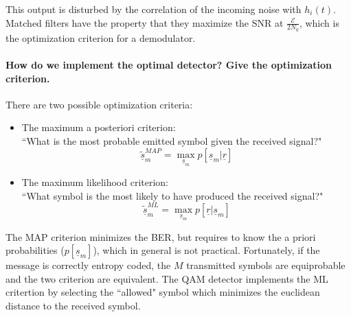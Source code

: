 This output is disturbed by the correlation of the incoming noise with $h_i(t)$. Matched filters have the property that they maximize the SNR at $\frac{\mathcal{E}}{2N_0}$, which is the optimization criterion for a demodulator.

\paragraph{How do we implement the optimal detector? Give the optimization criterion.}
There are two possible optimization criteria:
\begin{itemize}
  \item The maximum a posteriori criterion:\\
  ``What is the most probable emitted symbol given the received signal?"
  \[
  \underline{\tilde{s}}_m^{MAP} = \max_{\underline{s}_m} p[\underline{s}_m|\underline{r}]
  \]
  \item The maximum likelihood criterion:\\
  ``What symbol is the most likely to have produced the received signal?"
  \[
  \underline{\tilde{s}}_m^{ML} = \max_{\underline{s}_m} p[\underline{r}|\underline{s}_m]
  \]
\end{itemize}

The MAP criterion minimizes the BER, but requires to know the a priori probabilities ($p[\underline{s}_m]$), which in general is not practical. Fortunately, if the message is correctly entropy coded, the $M$ transmitted symbols are equiprobable and the two criterion are equivalent.
The QAM detector implements the ML critertion by selecting the ``allowed" symbol which minimizes the euclidean distance to the received symbol.
